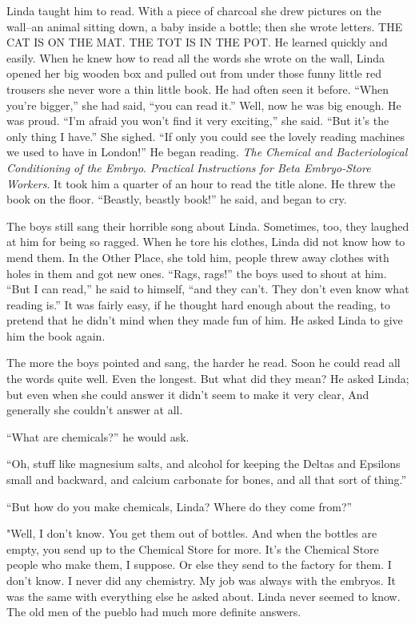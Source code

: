 \documentclass[12pt]{report}
\begin{document}
Linda taught him to read. With a piece of charcoal she drew pictures on
the wall--an animal sitting down, a baby inside a bottle; then she wrote
letters. THE CAT IS ON THE MAT. THE TOT IS IN THE POT. He learned
quickly and easily. When he knew how to read all the words she wrote on
the wall, Linda opened her big wooden box and pulled out from under
those funny little red trousers she never wore a thin little book. He
had often seen it before. ``When you're bigger,'' she had said, ``you
can read it.'' Well, now he was big enough. He was proud. ``I'm afraid
you won't find it very exciting,'' she said. ``But it's the only thing I
have.'' She sighed. ``If only you could see the lovely reading machines
we used to have in London!'' He began reading. \emph{The Chemical and
Bacteriological Conditioning of the Embryo}. \emph{Practical
Instructions for Beta Embryo-Store Workers}. It took him a quarter of an
hour to read the title alone. He threw the book on the floor. ``Beastly,
beastly book!'' he said, and began to cry.

The boys still sang their horrible song about Linda. Sometimes, too,
they laughed at him for being so ragged. When he tore his clothes, Linda
did not know how to mend them. In the Other Place, she told him, people
threw away clothes with holes in them and got new ones. ``Rags, rags!''
the boys used to shout at him. ``But I can read,'' he said to himself,
``and they can't. They don't even know what reading is.'' It was fairly
easy, if he thought hard enough about the reading, to pretend that he
didn't mind when they made fun of him. He asked Linda to give him the
book again.

The more the boys pointed and sang, the harder he read. Soon he could
read all the words quite well. Even the longest. But what did they mean?
He asked Linda; but even when she could answer it didn't seem to make it
very clear, And generally she couldn't answer at all.

``What are chemicals?'' he would ask.

``Oh, stuff like magnesium salts, and alcohol for keeping the Deltas and
Epsilons small and backward, and calcium carbonate for bones, and all
that sort of thing.''

``But how do you make chemicals, Linda? Where do they come from?''

"Well, I don't know. You get them out of bottles. And when the bottles
are empty, you send up to the Chemical Store for more. It's the Chemical
Store people who make them, I suppose. Or else they send to the factory
for them. I don't know. I never did any chemistry. My job was always
with the embryos. It was the same with everything else he asked about.
Linda never seemed to know. The old men of the pueblo had much more
definite answers.
\end{document}
